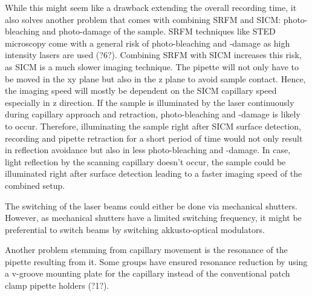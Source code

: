 While this might seem like a drawback extending the overall recording time, it
also solves another problem that comes with combining SRFM and SICM:
photo-bleaching and photo-damage of the sample. SRFM techniques like STED
microscopy come with a general risk of photo-bleaching and -damage as high
intensity lasers are used (?6?). Combining SRFM with SICM increases this risk,
as SICM is a much slower imaging technique. The pipette will not only have to
be moved in the xy plane but also in the z plane to avoid sample
contact. Hence, the imaging speed will mostly be dependent on the SICM
capillary speed especially in z direction. If the sample is illuminated by the
laser continuously during capillary approach and retraction, photo-bleaching
and -damage is likely to occur. Therefore, illuminating the sample right after
SICM surface detection, recording and pipette retraction for a short period of
time would not only result in reflection avoidance but also in less
photo-bleaching and -damage. In case, light reflection by the scanning
capillary doesn't occur, the sample could be illuminated right after surface
detection leading to a faster imaging speed of the combined setup.

The switching of the laser beams could either be done via mechanical
shutters. However, as mechanical shutters have a limited switching frequency,
it might be preferential to switch beams by switching akkusto-optical modulators.

Another problem stemming from capillary movement is the resonance of the
pipette resulting from it. Some groups have ensured resonance reduction by
using a v-groove mounting plate for the capillary instead of the conventional
patch clamp pipette holders (?1?).

 	

